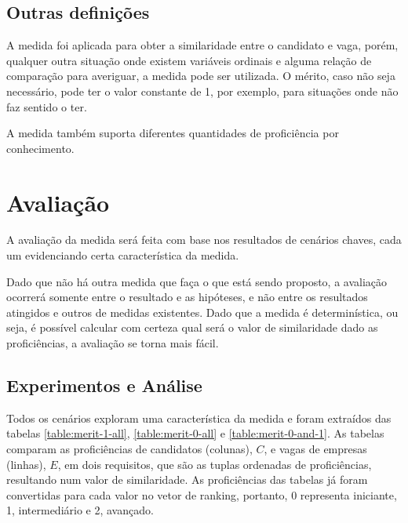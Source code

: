 \documentclass[preprint,12pt]{elsarticle}
\begin{document}
\subsection{Outras definições}

A medida foi aplicada para obter a similaridade entre o candidato e vaga, porém, qualquer outra situação onde existem variáveis ordinais e alguma relação de comparação para averiguar, a medida pode ser utilizada. O mérito, caso não seja necessário, pode ter o valor constante de 1, por exemplo, para situações onde não faz sentido o ter.

A medida também suporta diferentes quantidades de proficiência por conhecimento.

\section{Avaliação}
\label{sec:sample4}

A avaliação da medida será feita com base nos resultados de cenários chaves, cada um evidenciando certa característica da medida. 

Dado que não há outra medida que faça o que está sendo proposto, a avaliação ocorrerá somente entre o resultado e as hipóteses, e não entre os resultados atingidos e outros de medidas existentes. Dado que a medida é determinística, ou seja, é possível calcular com certeza qual será o valor de similaridade dado as proficiências, a avaliação se torna mais fácil.

\subsection{Experimentos e Análise}
\label{ssec:experiments}

Todos os cenários exploram uma característica da medida e foram extraídos das tabelas \ref{table:merit-1-all}, \ref{table:merit-0-all} e \ref{table:merit-0-and-1}. As tabelas comparam as proficiências de candidatos  (colunas), $C$, e vagas de empresas (linhas), $E$, em dois requisitos, que são as tuplas ordenadas de proficiências, resultando num valor de similaridade. As proficiências das tabelas já foram convertidas para cada valor no vetor de ranking, portanto, 0 representa iniciante, 1, intermediário e 2, avançado. 
\end{document}
